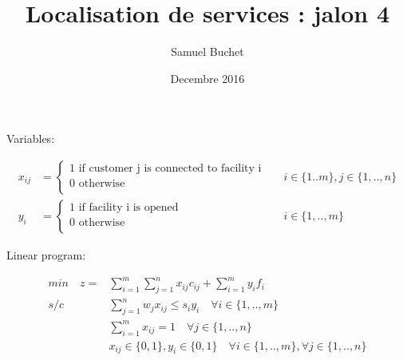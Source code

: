 \documentclass{article}
\title{Localisation de services : jalon 4}
\author{Samuel Buchet}
\date{Decembre 2016}
\begin{document}
Variables:

\begin{align*}
x_{ij} &= \begin{cases}
        1 \text{ if customer j is connected to facility i}\\
        0 \text{ otherwise} \\
    \end{cases}
&&i \in \{1..m\}, j \in \{1,..,n\} \\
y_i &= \begin{cases}
        1 \text{ if facility i is opened}\\
        0 \text{ otherwise} \\
    \end{cases}
&&i \in \{1,..,m\}
\end{align*}

Linear program:

\begin{align}
min \quad z = &\sum\limits_{i=1}^m \sum\limits_{j=1}^n x_{ij}c_{ij} + \sum\limits_{i=1}^m y_i f_i \\
  s/c \quad &\sum\limits_{j=1}^n w_j x_{ij} \leq s_i y_i \quad \forall i \in \{1, .., m\} \\
            &\sum\limits_{i=1}^m x_{ij} = 1 \quad \forall j \in \{1, .., n\} \\
            &x_{ij} \in \{0,1\}, y_i \in \{0,1\} \quad \forall i \in \{1,..,m\}, \forall j \in \{1,..,n\}
\end{align}
\end{document}
